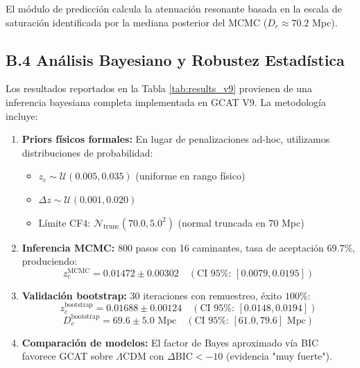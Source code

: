 \documentclass[12pt, a4paper]{article}
\theoremstyle{plain}
\theoremstyle{definition}
\begin{document}
El módulo de predicción calcula la atenuación resonante basada en la escala de saturación identificada por la mediana posterior del MCMC ($D_c \approx 70.2$ Mpc).

\begin{algorithm}[H]
\SetAlgoLined
{}
\caption{Cálculo de la opacidad resonante para GWs}
\label{alg:gw}
\end{algorithm}

\subsection{B.4 Análisis Bayesiano y Robustez Estadística}

Los resultados reportados en la Tabla \ref{tab:results_v9} provienen de una inferencia bayesiana completa implementada en GCAT V9. La metodología incluye:

\begin{enumerate}
    \item \textbf{Priors físicos formales:} En lugar de penalizaciones ad-hoc, utilizamos distribuciones de probabilidad:
    \begin{itemize}
        \item $z_c \sim \mathcal{U}(0.005, 0.035)$ (uniforme en rango físico)
        \item $\Delta z \sim \mathcal{U}(0.001, 0.020)$
        \item Límite CF4: $\mathcal{N}_{\text{trunc}}(70.0, 5.0^2)$ (normal truncada en 70 Mpc)
    \end{itemize}
    
    \item \textbf{Inferencia MCMC:} 800 pasos con 16 caminantes, tasa de aceptación $69.7\%$, produciendo:
    \[
    z_c^{\text{MCMC}} = 0.01472 \pm 0.00302 \quad (\text{CI 95\%: } [0.0079, 0.0195])
    \]
    
    \item \textbf{Validación bootstrap:} 30 iteraciones con remuestreo, éxito $100\%$:
    \[
    z_c^{\text{bootstrap}} = 0.01688 \pm 0.00124 \quad (\text{CI 95\%: } [0.0148, 0.0194])
    \]
    \[
    D_c^{\text{bootstrap}} = 69.6 \pm 5.0 \text{ Mpc} \quad (\text{CI 95\%: } [61.0, 79.6] \text{ Mpc})
    \]
    
    \item \textbf{Comparación de modelos:} El factor de Bayes aproximado vía BIC favorece GCAT sobre $\Lambda$CDM con $\Delta\text{BIC} < -10$ (evidencia "muy fuerte").
\end{enumerate}
\end{document}

